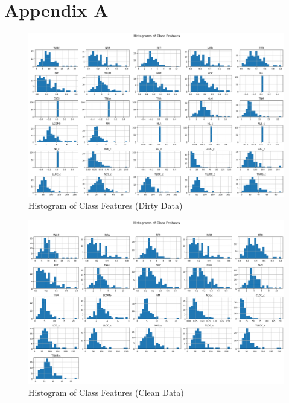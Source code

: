 \section*{Appendix A}
\label{appendix:a}


\begin{landscape}
\begin{figure}[!h] %
    \centering
    \includegraphics[height=0.95\textheight]{images/dirty-class.png}
    \caption{Histogram of Class Features (Dirty Data)}
    \label{fig:dirty-class}
\end{figure}
\end{landscape}
\restoregeometry

\begin{landscape}
\begin{figure}[!h]
    \centering
    \includegraphics[height=0.95\textheight]{images/clean-class.png}
    \caption{Histogram of Class Features (Clean Data)}
    \label{fig:clean-class}
\end{figure}
\end{landscape}
\restoregeometry

